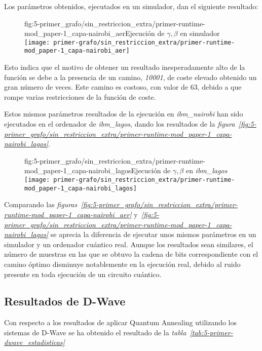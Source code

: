Los parámetros obtenidos, ejecutados en un simulador, dan el siguiente resultado:
\begin{figure}[htbp]{fig:5-primer_grafo/sin_restriccion_extra/primer-runtime-mod_paper-1_capa-nairobi_aer}{Ejecución de $\gamma, \beta$ en simulador}
  \centering
  \texttt{[image: primer-grafo/sin\_restriccion\_extra/primer-runtime-mod\_paper-1\_capa-nairobi\_aer]}
\end{figure}

Esto indica que el motivo de obtener un resultado inesperadamente alto de la función se debe a la presencia de un camino, \textit{10001}, de coste elevado obtenido un gran número de veces. Este camino es costoso, con valor de 63, debido a que rompe varias restricciones de la función de coste.

Estos mismos parámetros resultados de la ejecución en \textit{ibm\_nairobi} han sido ejecutados en el ordenador de \textit{ibm\_lagos}, dando los resultados de la \textit{figura~\ref{fig:5-primer_grafo/sin_restriccion_extra/primer-runtime-mod_paper-1_capa-nairobi_lagos}}.

\begin{figure}[htbp]{fig:5-primer_grafo/sin_restriccion_extra/primer-runtime-mod_paper-1_capa-nairobi_lagos}{Ejecución de \(\gamma, \beta\) en \textit{ibm\_lagos}}
  \centering
  \texttt{[image: primer-grafo/sin\_restriccion\_extra/primer-runtime-mod\_paper-1\_capa-nairobi\_lagos]}
\end{figure}

Comparando las \textit{figuras~\ref{fig:5-primer_grafo/sin_restriccion_extra/primer-runtime-mod_paper-1_capa-nairobi_aer}} y\textit{~\ref{fig:5-primer_grafo/sin_restriccion_extra/primer-runtime-mod_paper-1_capa-nairobi_lagos}}
se aprecia la diferencia de ejecutar unos mismos parámetros en un simulador y un ordenador cuántico real. Aunque los resultados sean similares, el número de muestras en las que se obtuvo la cadena de bits correspondiente con el camino óptimo disminuye notablemente en la ejecución real, debido al ruido presente en toda ejecución de un circuito cuántico.


\subsection{Resultados de D-Wave}

Con respecto a los resultados de aplicar Quantum Annealing utilizando los sistemas de D-Wave se ha obtenido el resultado de la \textit{tabla~\ref{tab:5-primer-dwave_estadisticas}}

